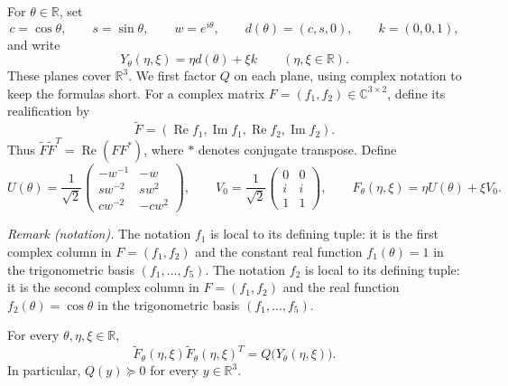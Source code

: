 For $\theta\in\mathbb R$, set
\[
 c=\cos\theta,\qquad s=\sin\theta,\qquad w=e^{i\theta},
 \qquad d(\theta)=(c,s,0),\qquad k=(0,0,1),
\]
and write
\[
 Y_\theta(\eta,\xi)=\eta d(\theta)+\xi k
 \qquad (\eta,\xi\in\mathbb R).
\]
These planes cover $\mathbb R^3$.  We first factor $Q$ on each plane,
using complex notation to keep the formulas short.  For a complex matrix
$F=(f_1,f_2)\in\mathbb C^{3\times2}$, define its realification by
\[
 \widetilde F=(\operatorname{Re}f_1,\operatorname{Im}f_1,
                 \operatorname{Re}f_2,\operatorname{Im}f_2).
\]
Thus $\widetilde F\widetilde F^T=\operatorname{Re}(FF^*)$, where $*$
denotes conjugate transpose.  Define
\begin{equation}\label{eq:U}
 U(\theta)=\frac1{\sqrt2}
 \begin{pmatrix}
 -w^{-1}&-w\\
 sw^{-2}&sw^2\\
 cw^{-2}&-cw^2
 \end{pmatrix},\qquad
 V_0=\frac1{\sqrt2}
 \begin{pmatrix}0&0\\ i&i\\1&1\end{pmatrix},
 \qquad F_\theta(\eta,\xi)=\eta U(\theta)+\xi V_0.
\end{equation}

\noindent\textit{Remark (notation).} The notation $f_1$ is local to its defining tuple: it is the first complex column in $F=(f_1,f_2)$ and the constant real function $f_1(\theta)=1$ in the trigonometric basis $(f_1,\ldots,f_5)$. The notation $f_2$ is local to its defining tuple: it is the second complex column in $F=(f_1,f_2)$ and the real function $f_2(\theta)=\cos\theta$ in the trigonometric basis $(f_1,\ldots,f_5)$.


\begin{lemma}\label{lem:gram}
For every $\theta,\eta,\xi\in\mathbb R$,
\begin{equation}\label{eq:gram}
 \widetilde F_\theta(\eta,\xi)
 \widetilde F_\theta(\eta,\xi)^T
 =Q\bigl(Y_\theta(\eta,\xi)\bigr).
\end{equation}
In particular, $Q(y)\succeq0$ for every $y\in\mathbb R^3$.
\end{lemma}

